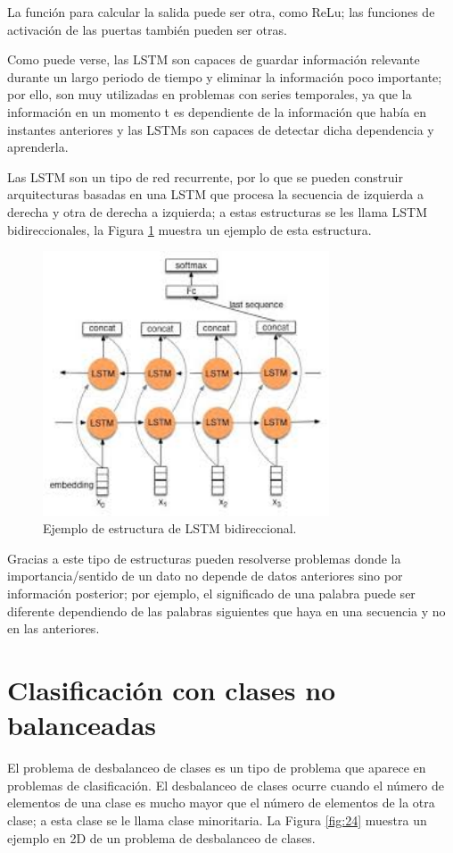 La función para calcular la salida puede ser otra, como ReLu; las funciones de activación de las puertas también pueden ser otras.\newline

Como puede verse, las LSTM son capaces de guardar información relevante durante un largo periodo de tiempo y eliminar la información poco importante; por ello, son muy utilizadas en problemas con series temporales, ya que la información en un momento t es dependiente de la información que había en instantes anteriores y las LSTMs son capaces de detectar dicha dependencia y aprenderla.\newline

Las LSTM son un tipo de red recurrente, por lo que se pueden construir arquitecturas basadas en una LSTM que procesa la secuencia de izquierda a derecha y otra de derecha a izquierda; a estas estructuras se les llama LSTM bidireccionales, la Figura \ref{fig:23} muestra un ejemplo de esta estructura.\newline
\newpage

\begin{figure}[H]
	\centering
	\includegraphics[width=85mm]{imagenes/bidi-lstm.jpg}
	\caption{Ejemplo de estructura de LSTM bidireccional.}
	\label{fig:23}
\end{figure}
\verticalspace
Gracias a este tipo de estructuras pueden resolverse problemas donde la importancia/sentido de un dato no depende de datos anteriores sino por información posterior; por ejemplo, el significado de una palabra puede ser diferente dependiendo de las palabras siguientes que haya en una secuencia y no en las anteriores.
\newpage
\section{Clasificación con clases no balanceadas}
El problema de desbalanceo de clases es un tipo de problema que aparece en problemas de clasificación. El desbalanceo de clases ocurre cuando el número de elementos de una clase es mucho mayor que el número de elementos de la otra clase; a esta clase se le llama clase minoritaria. La Figura \ref{fig:24} muestra un ejemplo en 2D de un problema de desbalanceo de clases.\newline

